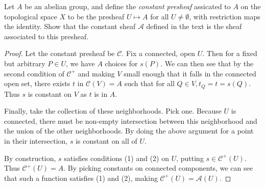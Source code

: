 \begin{exercise}%
	Let $A $ be an abelian group, and define the \textit{constant presheaf} assicated to $A $ on the topological space $X $ to be the presheaf $U\mapsto A $ for all $U\ne \emptyset $, with restriction maps the identity. Show that the constant sheaf $\mathscr{A} $ defined in the text is the sheaf associated to this presheaf.
\end{exercise}
\begin{proof}
	Let the constant presheaf be $\mathscr{C} $.
	Fix a connected, open $U $.
	Then for a fixed but arbitrary $P \in U $, we have $A $ choices for $s(P) $.
	We can then see that by the second condition of $\mathscr{C}^+ $ and making $V $ small enough that it falls in the connected open set, there exists $t$ in $\mathscr{C}(V) = A$ such that for all $Q \in V, t_Q = t = s(Q)$.
	Thus $s $ is constant on $V $ as $t $ is in $A $.

	Finally, take the collection of these neighborhoods.
	Pick one.
	Because $U $ is connected, there must be non-empty intersection between this neighborhood and the union of the other neighborhoods.
	By doing the above argument for a point in their intersection, $s $ is constant on all of $U $.

	By construction, $s $ satisfies conditions (1) and (2) on $U $, putting $s \in \mathscr{C}^+(U) $.
	Thus $\mathscr{C}^+(U) = A $.
	By picking constants on connected components, we can see that such a function satisfies (1) and (2), making $\mathscr{C}^+(U) = \mathscr{A}(U) $.
\end{proof}

